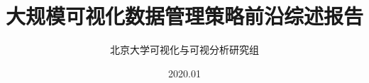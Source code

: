 \documentclass[12pt]{article}
\title{大规模可视化数据管理策略前沿综述报告}
\author{北京大学可视化与可视分析研究组}
\date{2020.01}
\begin{document}
\begin{spacing}{1.5}
\begin{CJK*}{UTF8}{gbsn}



\clearpage
\tableofcontents

\clearpage

\clearpage

\clearpage

\clearpage

\clearpage

\clearpage

\printbibliography[heading = bibintoc]
% 
% 

\end{CJK*}
\end{spacing}
\end{document}

